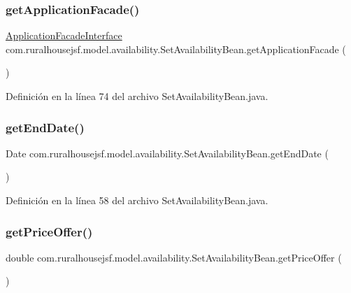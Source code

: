 \subsubsection{\texorpdfstring{getApplicationFacade()}{getApplicationFacade()}}
{\footnotesize\ttfamily \mbox{\hyperlink{interfacecom_1_1ruralhousejsf_1_1business_logic_1_1_application_facade_interface}{Application\+Facade\+Interface}} com.\+ruralhousejsf.\+model.\+availability.\+Set\+Availability\+Bean.\+get\+Application\+Facade (\begin{DoxyParamCaption}{ }\end{DoxyParamCaption})}



Definición en la línea 74 del archivo Set\+Availability\+Bean.\+java.

\mbox{\label{classcom_1_1ruralhousejsf_1_1model_1_1availability_1_1_set_availability_bean_a6a42faf50c5cf766285bf4018c19d477}} 
\subsubsection{\texorpdfstring{getEndDate()}{getEndDate()}}
{\footnotesize\ttfamily Date com.\+ruralhousejsf.\+model.\+availability.\+Set\+Availability\+Bean.\+get\+End\+Date (\begin{DoxyParamCaption}{ }\end{DoxyParamCaption})}



Definición en la línea 58 del archivo Set\+Availability\+Bean.\+java.

\mbox{\label{classcom_1_1ruralhousejsf_1_1model_1_1availability_1_1_set_availability_bean_a264ab7e009d744abc40af63581bbdb05}} 
\subsubsection{\texorpdfstring{getPriceOffer()}{getPriceOffer()}}
{\footnotesize\ttfamily double com.\+ruralhousejsf.\+model.\+availability.\+Set\+Availability\+Bean.\+get\+Price\+Offer (\begin{DoxyParamCaption}{ }\end{DoxyParamCaption})}




